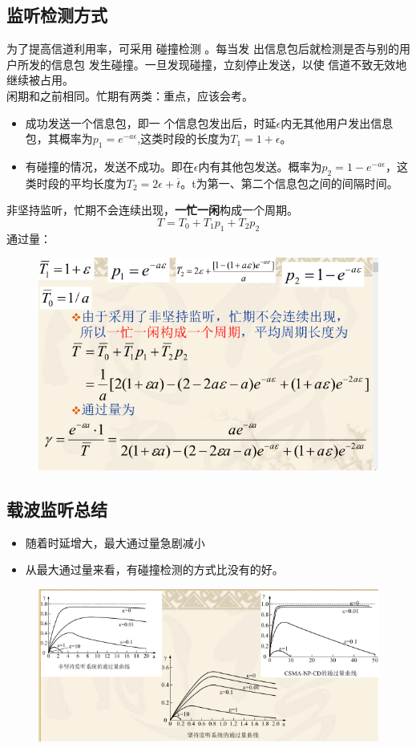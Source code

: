 \subsection{监听检测方式}
为了提高信道利用率，可采用 碰撞检测 。每当发
出信息包后就检测是否与别的用户所发的信息包
发生碰撞。一旦发现碰撞，立刻停止发送，以使
信道不致无效地继续被占用。\\
闲期和之前相同。忙期有两类：重点，应该会考。
\begin{itemize}
	\item 成功发送一个信息包，即一
	个信息包发出后，时延$ \epsilon $内无其他用户发出信息包，其概率为$ p_1=e^{-a\epsilon} $,这类时段的长度为$ T_1 = 1+\epsilon $。
	\item 有碰撞的情况，发送不成功。即在$ \epsilon $内有其他包发送。概率为$ p_2 = 1 - e^{-a\epsilon} $，这类时段的平均长度为$ T_2 = 2\epsilon + \overline{t} $。t为第一、第二个信息包之间的间隔时间。
\end{itemize}
非坚持监听，忙期不会连续出现，\textbf{一忙一闲}构成一个周期。
\begin{equation}\label{key}
T = T_0 + T_1p_1 + T_2p_2
\end{equation}
通过量：
\begin{figure}[H]
	\centering
	\includegraphics[width=0.7\linewidth]{figures/screenshot013}
	\caption{}
	\label{fig:screenshot013}
\end{figure}
\subsection{载波监听总结}
\begin{itemize}
	\item 随着时延增大，最大通过量急剧减小
	\item 从最大通过量来看，有碰撞检测的方式比没有的好。
\end{itemize}
\begin{figure}[H]
	\centering
	\includegraphics[width=1\linewidth]{figures/screenshot014}
	\caption{}
	\label{fig:screenshot014}
\end{figure}
